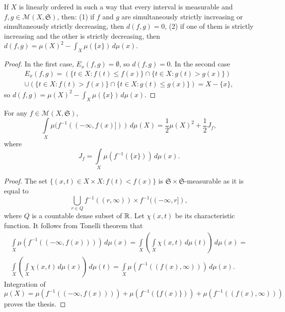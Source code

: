 \begin{prop}
  If $X$ is linearly ordered in such a way that every interval is
  measurable and $f, g \in \mathcal{M}(X, \mathfrak{S})$, then: (1) if
  $f$ and $g$ are simultaneously strictly increasing or simultaneously
  strictly decreasing, then $d(f, g) = 0$, (2) if one of them is
  strictly increasing and the other is strictly decreasing, then $d(f,
  g) = \mu(X)^2 - \int_X \mu(\{x\}) \, d\mu(x)$.
\end{prop}

\begin{proof}
  In the first case, $E_x(f, g) = \emptyset$, so $d(f, g) = 0$. In the
  second case \[
  \begin{split}
    E_x(f, g) = (\{ t \in X \colon f(t) \leq f(x) \} \cap \{ t \in X
    \colon g(t) > g(x) \}) \\
    \cup (\{ t \in X \colon f(t) > f(x) \} \cap \{ t \in X \colon g(t)
    \leq g(x) \}) = X - \{ x \},
  \end{split} \]
  so $d(f, g) = \mu(X)^2 - \int_X \mu(\{x\}) \, d\mu(x)$.
\end{proof}

\begin{prop} \label{prop:integr1}
  For any $f \in \mathcal{M}(X, \mathfrak{S})$, \[ \int \limits_X
  \mu(f^{-1}((-\infty, f(x)])) \, d\mu(X) = \frac{1}{2} \mu(X)^2 +
    \frac{1}{2} J_f, \] where
    \begin{equation} \label{eq:definitionofJ}
      J_f = \int \limits_X \mu(f^{-1}(\{x\})) \, d\mu(x).
    \end{equation}
\end{prop}

\begin{proof}
  The set $\{(x, t) \in X \times X \colon f(t) < f(x)\}$ is
  $\mathfrak{S} \times \mathfrak{S}$-measurable as it is equal to \[
  \bigcup_{r \in Q} f^{-1}((r, \infty)) \times f^{-1}((-\infty,
  r]), \] where $Q$ is a countable dense subset of $\mathbb{R}$. Let
    $\chi(x, t)$ be its characteristic function. It follows from
    Tonelli theorem \cite [p.~231] {billingsley-2009} that
    \[ \begin{split}
      \int \limits_X \mu(f^{-1}((-\infty, f(x)))) \, d\mu(x) = \int
      \limits_X \left( \int \limits_X \chi(x, t) \, d\mu(t) \right) \,
      d\mu(x) = \\ \int \limits_X \left( \int \limits_X \chi(x, t) \,
      d\mu(x) \right) \, d\mu(t) = \int \limits_X \mu(f^{-1}((f(x),
      \infty))) \, d\mu(x).
    \end{split} \]
    Integration of \[ \mu(X) = \mu(f^{-1}((-\infty, f(x)))) +
    \mu(f^{-1}(\{f(x)\})) + \mu(f^{-1}((f(x), \infty))) \] proves the
    thesis.
\end{proof}

